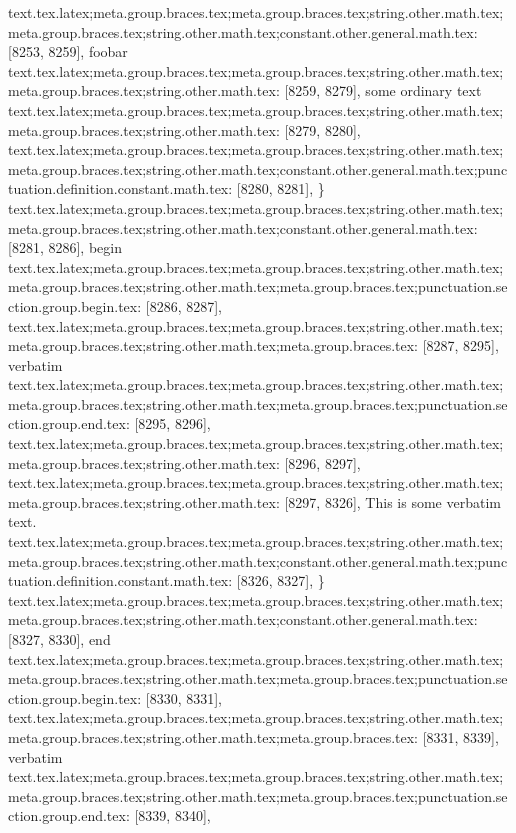 {{{{{{{{{{{{{{{{{{{{{{{{{{{{{{{{{{{{{{{{{{{{{{{{{{{{{{{{{{{{{{{{{{{{{{{{{{{{{{{{{{{{{{{{{{{{{{{{{{{{{{{{{{{{{{{{{{{{{{{{{{{{{{{{{{{{{{{{{{{{{{{{{{{{{{{{{{{{{{{{{{{{{{{{{{{{{{{{{{{{{{{{{{{{{{{{{{{{{{{{{{{{{{{{{{{{{{{{{{{{{{{{{{{{{{{{{{{{{{{text.tex.latex;meta.group.braces.tex;meta.group.braces.tex;string.other.math.tex;meta.group.braces.tex;string.other.math.tex;constant.other.general.math.tex: [8253, 8259], {foobar}
text.tex.latex;meta.group.braces.tex;meta.group.braces.tex;string.other.math.tex;meta.group.braces.tex;string.other.math.tex: [8259, 8279], { some ordinary text
}
text.tex.latex;meta.group.braces.tex;meta.group.braces.tex;string.other.math.tex;meta.group.braces.tex;string.other.math.tex: [8279, 8280], {
}
text.tex.latex;meta.group.braces.tex;meta.group.braces.tex;string.other.math.tex;meta.group.braces.tex;string.other.math.tex;constant.other.general.math.tex;punctuation.definition.constant.math.tex: [8280, 8281], {\}
text.tex.latex;meta.group.braces.tex;meta.group.braces.tex;string.other.math.tex;meta.group.braces.tex;string.other.math.tex;constant.other.general.math.tex: [8281, 8286], {begin}
text.tex.latex;meta.group.braces.tex;meta.group.braces.tex;string.other.math.tex;meta.group.braces.tex;string.other.math.tex;meta.group.braces.tex;punctuation.section.group.begin.tex: [8286, 8287], {{}
text.tex.latex;meta.group.braces.tex;meta.group.braces.tex;string.other.math.tex;meta.group.braces.tex;string.other.math.tex;meta.group.braces.tex: [8287, 8295], {verbatim}
text.tex.latex;meta.group.braces.tex;meta.group.braces.tex;string.other.math.tex;meta.group.braces.tex;string.other.math.tex;meta.group.braces.tex;punctuation.section.group.end.tex: [8295, 8296], {}}
text.tex.latex;meta.group.braces.tex;meta.group.braces.tex;string.other.math.tex;meta.group.braces.tex;string.other.math.tex: [8296, 8297], {
}
text.tex.latex;meta.group.braces.tex;meta.group.braces.tex;string.other.math.tex;meta.group.braces.tex;string.other.math.tex: [8297, 8326], {	This is some verbatim text.
}
text.tex.latex;meta.group.braces.tex;meta.group.braces.tex;string.other.math.tex;meta.group.braces.tex;string.other.math.tex;constant.other.general.math.tex;punctuation.definition.constant.math.tex: [8326, 8327], {\}
text.tex.latex;meta.group.braces.tex;meta.group.braces.tex;string.other.math.tex;meta.group.braces.tex;string.other.math.tex;constant.other.general.math.tex: [8327, 8330], {end}
text.tex.latex;meta.group.braces.tex;meta.group.braces.tex;string.other.math.tex;meta.group.braces.tex;string.other.math.tex;meta.group.braces.tex;punctuation.section.group.begin.tex: [8330, 8331], {{}
text.tex.latex;meta.group.braces.tex;meta.group.braces.tex;string.other.math.tex;meta.group.braces.tex;string.other.math.tex;meta.group.braces.tex: [8331, 8339], {verbatim}
text.tex.latex;meta.group.braces.tex;meta.group.braces.tex;string.other.math.tex;meta.group.braces.tex;string.other.math.tex;meta.group.braces.tex;punctuation.section.group.end.tex: [8339, 8340], {}}
}}}}}}}}}}}}}}}}}}}}}}}}}}}}}}}}}}}}}}}}}}}}}}}}}}}}}}}}}}}}}}}}}}}}}}}}}}}}}}}}}}}}}}}}}}}}}}}}}}}}}}}}}}}}}}}}}}}}}}}}}}}}}}}}}}}}}}}}}}}}}}}}}}}}}}}}}}}}}}}}}}}}}}}}}}}}}}}}}}}}}}}}}}}}}}}}}}}}}}}}}}}}}}}}}}}}}}}}}}}}}}}}}}}}}}}}}}}}}}}}}
